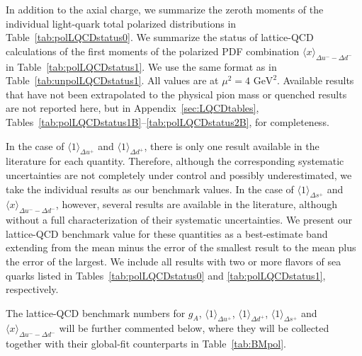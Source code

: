 In addition to the axial charge, we summarize the zeroth moments of the 
individual light-quark total polarized distributions in 
Table~\ref{tab:polLQCDstatus0}. 
%
We summarize the status of lattice-QCD calculations of the
first moments of the polarized PDF combination 
$\langle x \rangle_{\Delta u^- - \Delta d^-}$ in Table~\ref{tab:polLQCDstatus1}. 
%
We use the same format as in Table~\ref{tab:unpolLQCDstatus1}.
%
All values are at $\mu^2=4\mbox{ GeV}^2$.
%
Available results that have not been extrapolated to the physical pion mass
or quenched results are not reported here, but in Appendix~\ref{sec:LQCDtables},
Tables~\ref{tab:polLQCDstatus1B}--\ref{tab:polLQCDstatus2B}, for completeness.

In the case of $\langle 1 \rangle_{\Delta u^+}$ and $\langle 1 \rangle_{\Delta d^+}$,
there is only one result available in the literature for each quantity.
%
Therefore, although the corresponding systematic uncertainties are not 
completely under control and possibly underestimated, we take the individual 
results as our benchmark values.
%
In the case of $\langle 1 \rangle_{\Delta s^+}$ and 
$\langle x \rangle_{\Delta u^- - \Delta d^-}$, however, several results are available
in the literature, although without a full characterization of
their systematic uncertainties.
%
We present our lattice-QCD benchmark value for these quantities as
a best-estimate band extending from the mean minus the error of the 
smallest result to the mean plus the error of the largest. 
%
We include all results with two or more flavors of sea quarks listed in 
Tables~\ref{tab:polLQCDstatus0} and \ref{tab:polLQCDstatus1}, respectively.

The lattice-QCD benchmark numbers for $g_A$,
$\langle 1 \rangle_{\Delta u^+}$, $\langle 1 \rangle_{\Delta d^+}$,
$\langle 1 \rangle_{\Delta s^+}$ and $\langle x \rangle_{\Delta u^- - \Delta d^-}$
will be further commented below, where they will be collected together 
with their global-fit counterparts in Table~\ref{tab:BMpol}.

